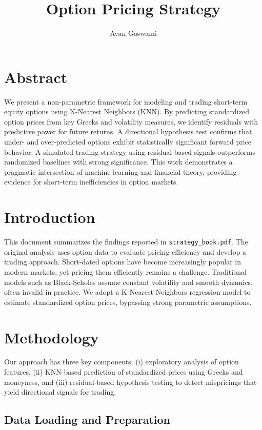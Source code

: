 \documentclass{article}
\title{Option Pricing Strategy}
\author{Ayan Goswami}
\date{}
\begin{document}
\maketitle
\section{Abstract}

We present a non-parametric framework for modeling and trading short-term equity options using K-Nearest Neighbors (KNN). By predicting standardized option prices from key Greeks and volatility measures, we identify residuals with predictive power for future returns. A directional hypothesis test confirms that under- and over-predicted options exhibit statistically significant forward price behavior. A simulated trading strategy using residual-based signals outperforms randomized baselines with strong significance. This work demonstrates a pragmatic intersection of machine learning and financial theory, providing evidence for short-term inefficiencies in option markets.

\section{Introduction}

This document summarizes the findings reported in \texttt{strategy\_book.pdf}. The original analysis uses option data to evaluate pricing efficiency and develop a trading approach. Short-dated options have become increasingly popular in modern markets, yet pricing them efficiently remains a challenge. Traditional models such as Black-Scholes assume constant volatility and smooth dynamics, often invalid in practice. We adopt a K-Nearest Neighbors regression model to estimate standardized option prices, bypassing strong parametric assumptions.

\section{Methodology}

Our approach has three key components: (i) exploratory analysis of option features, (ii) KNN-based prediction of standardized prices using Greeks and moneyness, and (iii) residual-based hypothesis testing to detect mispricings that yield directional signals for trading.

\subsection{Data Loading and Preparation}
\end{document}
